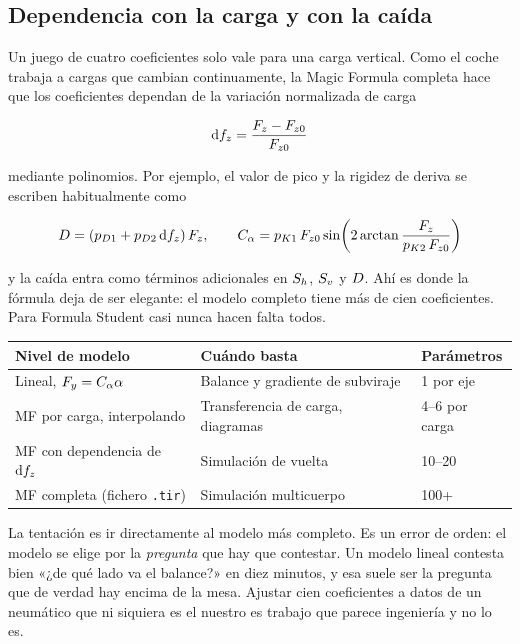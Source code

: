 \subsection{Dependencia con la carga y con la caída}

Un juego de cuatro coeficientes solo vale para una carga vertical. Como el coche
trabaja a cargas que cambian continuamente, la Magic Formula completa hace que
los coeficientes dependan de la variación normalizada de carga

\begin{equation}
  \mathrm{d}f_z = \frac{F_z - F_{z0}}{F_{z0}}
  \label{eq:dfz}
\end{equation}

mediante polinomios. Por ejemplo, el valor de pico y la rigidez de deriva se
escriben habitualmente como

\begin{equation}
  D = (p_{D1} + p_{D2}\,\mathrm{d}f_z)\,F_z, \qquad
  C_{\alpha} = p_{K1}\,F_{z0} \sin\!\left(2\arctan\frac{F_z}{p_{K2}\,F_{z0}}\right)
  \label{eq:dependencia_carga}
\end{equation}

y la caída entra como términos adicionales en $S_h$, $S_v$ y $D$. Ahí es
donde la fórmula deja de ser elegante: el modelo completo tiene más de cien
coeficientes. Para Formula Student casi nunca hacen falta todos.

\begin{center}
\begin{tabularx}{\textwidth}{@{}lXl@{}}
\toprule
\textbf{Nivel de modelo} & \textbf{Cuándo basta} & \textbf{Parámetros} \\
\midrule
Lineal, $F_y = C_{\alpha} \alpha$ & Balance y gradiente de subviraje & 1 por eje \\
MF por carga, interpolando & Transferencia de carga, diagramas & 4--6 por carga \\
MF con dependencia de $\mathrm{d}f_z$ & Simulación de vuelta & 10--20 \\
MF completa (fichero \texttt{.tir}) & Simulación multicuerpo & \num{100}+ \\
\bottomrule
\end{tabularx}
\end{center}

\begin{ojo}
La tentación es ir directamente al modelo más completo. Es un error de orden: el
modelo se elige por la \emph{pregunta} que hay que contestar. Un modelo lineal
contesta bien «¿de qué lado va el balance?» en diez minutos, y esa suele ser la
pregunta que de verdad hay encima de la mesa. Ajustar cien coeficientes a datos
de un neumático que ni siquiera es el nuestro es trabajo que parece ingeniería y
no lo es.
\end{ojo}

